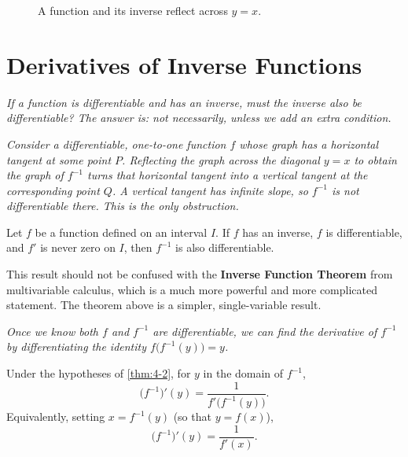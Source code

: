 \begin{figure}[ht]
  \centering
  
  \caption{A function and its inverse reflect across $y=x$.}
  \label{fig:inverse-reflection}
\end{figure}

\section{Derivatives of Inverse Functions}
\label{sec:4.4}

\textit{If a function is differentiable and has an inverse, must the inverse also be differentiable?  The answer is: not necessarily, unless we add an extra condition.}

\textit{Consider a differentiable, one-to-one function $f$ whose graph has a horizontal tangent at some point $P$.  Reflecting the graph across the diagonal $y = x$ to obtain the graph of $f^{-1}$ turns that horizontal tangent into a vertical tangent at the corresponding point $Q$.  A vertical tangent has infinite slope, so $f^{-1}$ is not differentiable there.  This is the only obstruction.}

\begin{theorem}
\label{thm:4-2}
Let $f$ be a function defined on an interval $I$.  If $f$ has an inverse, $f$ is differentiable, and $f'$ is never zero on $I$, then $f^{-1}$ is also differentiable.
\end{theorem}

\begin{remark}[Warning]
This result should not be confused with the \textbf{Inverse Function Theorem} from multivariable calculus, which is a much more powerful and more complicated statement.  The theorem above is a simpler, single-variable result.
\end{remark}

\textit{Once we know both $f$ and $f^{-1}$ are differentiable, we can find the derivative of $f^{-1}$ by differentiating the identity $f\!\bigl(f^{-1}(y)\bigr) = y$.}

\begin{theorem}
\label{thm:4-3}
Under the hypotheses of \cref{thm:4-2}, for $y$ in the domain of $f^{-1}$,
\[
  \bigl(f^{-1}\bigr)'(y) = \frac{1}{f'\!\bigl(f^{-1}(y)\bigr)}.
\]
Equivalently, setting $x = f^{-1}(y)$ (so that $y = f(x)$),
\[
  \bigl(f^{-1}\bigr)'(y) = \frac{1}{f'(x)}.
\]
\end{theorem}

